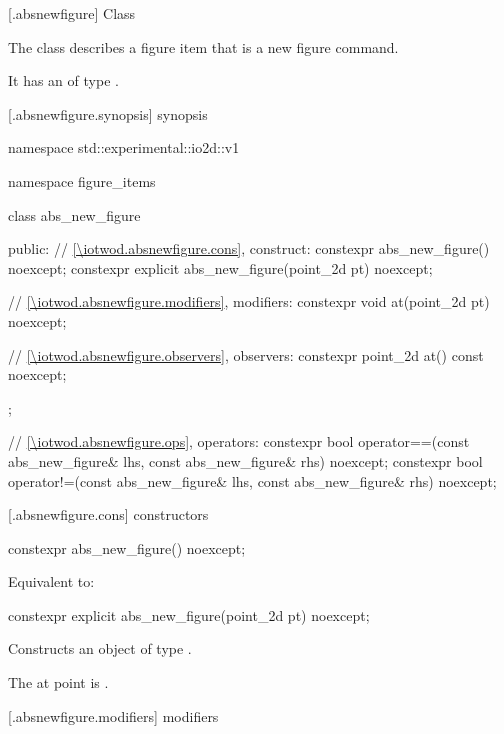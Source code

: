  [\iotwod.absnewfigure] {Class }

\pnum
{}%
The class  describes a figure item that is a new figure command.

\pnum
It has an  of type .

 [\iotwod.absnewfigure.synopsis] { synopsis}%

\begin{codeblock}
namespace std::experimental::io2d::v1 {
  namespace figure_items {
    class abs_new_figure {
    public:
      // \ref{\iotwod.absnewfigure.cons}, construct:
      constexpr abs_new_figure() noexcept;
      constexpr explicit abs_new_figure(point_2d pt) noexcept;

      // \ref{\iotwod.absnewfigure.modifiers}, modifiers:
      constexpr void at(point_2d pt) noexcept;

      // \ref{\iotwod.absnewfigure.observers}, observers:
      constexpr point_2d at() const noexcept;
    };
    
    // \ref{\iotwod.absnewfigure.ops}, operators:
    constexpr bool operator==(const abs_new_figure& lhs, const abs_new_figure& rhs) 
      noexcept;
    constexpr bool operator!=(const abs_new_figure& lhs, const abs_new_figure& rhs) 
      noexcept;
  }
}
\end{codeblock}

 [\iotwod.absnewfigure.cons] { constructors}%

%
\begin{itemdecl}
constexpr abs_new_figure() noexcept;
\end{itemdecl}
\begin{itemdescr}
\pnum
\effects
Equivalent to: 
\end{itemdescr}

%
\begin{itemdecl}
constexpr explicit abs_new_figure(point_2d pt) noexcept;
\end{itemdecl}
\begin{itemdescr}
\pnum
\effects
Constructs an object of type .

\pnum
The at point is .
\end{itemdescr}

 [\iotwod.absnewfigure.modifiers]{ modifiers}%

